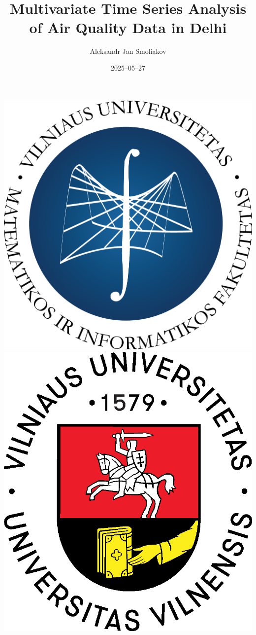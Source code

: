 \documentclass[svgnames, 12pt]{beamer}
\title[Air Quality Analysis in Delhi]{Multivariate Time Series Analysis of Air Quality Data in Delhi}
\author[A. J. Smoliakov]{Aleksandr Jan Smoliakov\inst{1}}
\institute[VU MIF]{\inst{1} Vilnius University, Faculty of Mathematics and Informatics}
\date{2025--05--27}
\begin{document}
\begin{frame}
	\includegraphics[scale=0.15]{MIF Garamond-logo.png} 
	\hfill
	\includegraphics[scale=0.15]{Logo_spalvotas.eps}
	\titlepage{}
\end{frame}
\end{document}
